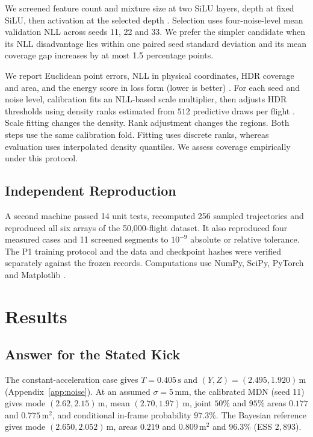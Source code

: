 \documentclass[11pt,a4paper]{article}
\begin{document}
We screened feature count and mixture size at two SiLU layers, depth at fixed SiLU, then activation at the selected depth \cite{silu2018}. Selection uses four-noise-level mean validation NLL across seeds 11, 22 and 33. We prefer the simpler candidate when its NLL disadvantage lies within one paired seed standard deviation and its mean coverage gap increases by at most 1.5 percentage points.

We report Euclidean point errors, NLL in physical coordinates, HDR coverage and area, and the energy score in loss form (lower is better) \cite{gneiting2007}. For each seed and noise level, calibration fits an NLL-based scale multiplier, then adjusts HDR thresholds using density ranks estimated from $512$ predictive draws per flight \cite{hpdsplit2022}. Scale fitting changes the density. Rank adjustment changes the regions. Both steps use the same calibration fold. Fitting uses discrete ranks, whereas evaluation uses interpolated density quantiles. We assess coverage empirically under this protocol.

\subsection{Independent Reproduction}
\label{sec:repro}

A second machine passed 14 unit tests, recomputed 256 sampled trajectories and reproduced all six arrays of the 50,000-flight dataset. It also reproduced four measured cases and 11 screened segments to $10^{-9}$ absolute or relative tolerance. The P1 training protocol and the data and checkpoint hashes were verified separately against the frozen records. Computations use NumPy, SciPy, PyTorch and Matplotlib \cite{harris2020,virtanen2020,paszke2019,hunter2007}.

\section{Results}
\subsection{Answer for the Stated Kick}
\label{sec:case}

The constant-acceleration case gives $T=0.405\,\mathrm{s}$ and $(Y,Z)=(2.495,1.920)\,\mathrm{m}$ (Appendix~\ref{app:noise}). At an assumed $\sigma=5\,\mathrm{mm}$, the calibrated MDN (seed 11) gives mode $(2.62,2.15)\,\mathrm{m}$, mean $(2.70,1.97)\,\mathrm{m}$, joint $50\%$ and $95\%$ areas $0.177$ and $0.775\,\mathrm{m^2}$, and conditional in-frame probability $97.3\%$. The Bayesian reference gives mode $(2.650,2.052)\,\mathrm{m}$, areas $0.219$ and $0.809\,\mathrm{m^2}$ and $96.3\%$ (ESS $2{,}893$).
\end{document}
